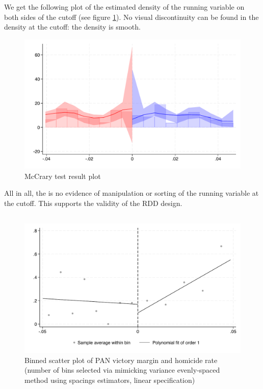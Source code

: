 \documentclass{article}
\begin{document}
We get the following plot of the estimated density of the running variable on both sides of the cutoff (see figure \ref{fig:McCrary}). No visual discontinuity can be found in the density at the cutoff: the density is smooth. 

\begin{figure}[H]
    \centering
    \includegraphics[width=\textwidth]{../outputs/mccrary_plot.pdf}
    \caption{McCrary test result plot}
    \label{fig:McCrary}
\end{figure}

All in all, the is no evidence of manipulation or sorting of the running variable at the cutoff.  This supports the validity of the RDD design.


\subsection{}

\begin{figure}[H]
    \centering
    \includegraphics[scale=0.5]{../outputs/binned_scatter_esmv_linear_plot.pdf}
    \caption{Binned scatter plot of PAN victory margin and homicide rate (number of bins selected via mimicking variance evenly-spaced method using spacings estimators, linear specification)}
    \label{fig:binned_scatter_esmv_linear}
\end{figure}
\end{document}
